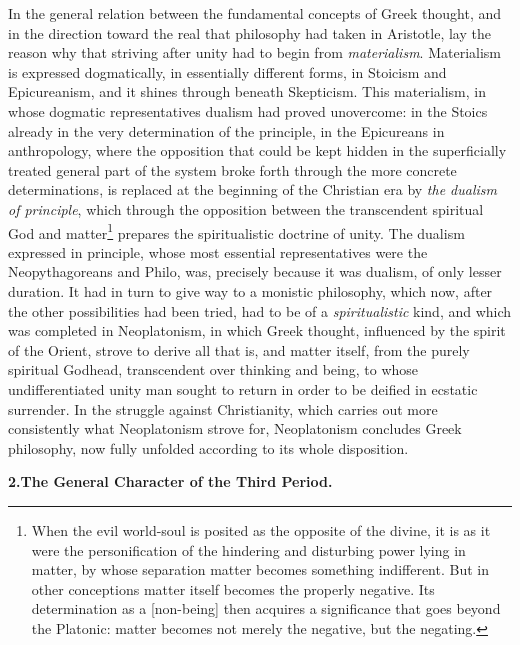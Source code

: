 In the general relation between the fundamental concepts of Greek thought,
and in the direction toward the real that philosophy had taken in Aristotle,
lay the reason why that striving after unity had to begin from
\emph{materialism}. Materialism is expressed dogmatically, in essentially
different forms, in Stoicism and Epicureanism, and it shines through beneath
Skepticism. This materialism, in whose dogmatic representatives dualism had
proved unovercome: in the Stoics already in the very determination of the
principle, in the Epicureans in anthropology, where the opposition that could
be kept hidden in the superficially treated general part of the system broke
forth through the more concrete determinations, is replaced at the beginning
of the Christian era by \emph{the dualism of principle}, which through the
opposition between the transcendent spiritual God and matter\footnote{When the
evil world-soul is posited as the opposite of the divine, it is as it were the
personification of the hindering and disturbing power lying in matter, by
whose separation matter becomes something indifferent. But in other
conceptions matter itself becomes the properly negative. Its determination as
a  [non-being] then acquires a significance that goes beyond the
Platonic: matter becomes not merely the negative, but the negating.} prepares
the spiritualistic doctrine of unity. The dualism expressed in
principle, whose most essential representatives were the Neopythagoreans and
Philo, was, precisely because it was dualism, of only lesser duration. It had
in turn to give way to a monistic philosophy, which now, after the other
possibilities had been tried, had to be of a \emph{spiritualistic} kind, and
which was completed in Neoplatonism, in which Greek thought, influenced by the
spirit of the Orient, strove to derive all that is, and matter itself, from
the purely spiritual Godhead, transcendent over thinking and being, to whose
undifferentiated unity man sought to return in order to be deified in ecstatic
surrender. In the struggle against Christianity, which carries out more
consistently what Neoplatonism strove for, Neoplatonism concludes Greek
philosophy, now fully unfolded according to its whole disposition.

\divrule

\begin{center}
\textbf{2.\enspace The General Character of the Third Period.}
\end{center}

